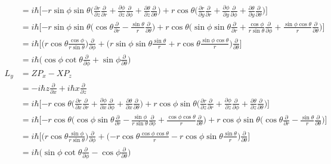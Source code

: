 \documentclass[../principles-of-quantum-mechanics.tex]{subfiles}
\begin{document}
\begin{questions}
\begin{solution}
\begin{align*}
			&= i\hbar\Big[{-r\sin\phi}\sin\theta\Big(\frac{\partial r}{\partial z}\frac{\partial}{\partial r} + \frac{\partial \phi}{\partial z}\frac{\partial}{\partial \phi} + \frac{\partial \theta}{\partial z}\frac{\partial}{\partial\theta}\Big) + r\cos\theta\Big(\frac{\partial r}{\partial y}\frac{\partial}{\partial r} + \frac{\partial \phi}{\partial y}\frac{\partial}{\partial \phi} + \frac{\partial \theta}{\partial y}\frac{\partial}{\partial\theta}\Big)\Big] \\
			&= i\hbar\Big[{-r\sin\phi}\sin\theta\Big(\cos\theta\frac{\partial}{\partial r} - \frac{\sin\theta}{r}\frac{\partial}{\partial\theta}\Big) + r\cos\theta\Big(\sin\phi\sin\theta\frac{\partial}{\partial r} + \frac{\cos\phi}{r\sin\theta}\frac{\partial}{\partial \phi} + \frac{\sin\phi\cos\theta}{r}\frac{\partial}{\partial\theta}\Big)\Big] \\
			&= i\hbar\Big[\Big(r\cos\theta\frac{\cos\phi}{r\sin\theta}\Big)\frac{\partial}{\partial \phi} + \Big(r\sin\phi\sin\theta\frac{\sin\theta}{r} + r\cos\theta\frac{\sin\phi\cos\theta}{r}\Big)\frac{\partial}{\partial\theta}\Big] \\
			&= i\hbar\Big(\cos\phi\cot\theta\frac{\partial}{\partial\phi} + \sin\phi\frac{\partial}{\partial\theta}\Big) \\
			L_y &= ZP_x - XP_z \\
			&= -i\hbar z\frac{\partial}{\partial x} + i\hbar x\frac{\partial}{\partial z} \\
			&= i\hbar\Big[{-r\cos\theta}\Big(\frac{\partial r}{\partial x}\frac{\partial}{\partial r} + \frac{\partial \phi}{\partial x}\frac{\partial}{\partial \phi} + \frac{\partial \theta}{\partial x}\frac{\partial}{\partial\theta}\Big) + r\cos\phi\sin\theta\Big(\frac{\partial r}{\partial z}\frac{\partial}{\partial r} + \frac{\partial \phi}{\partial z}\frac{\partial}{\partial \phi} + \frac{\partial \theta}{\partial z}\frac{\partial}{\partial\theta}\Big)\Big] \\
			&= i\hbar\Big[{-r\cos\theta}\Big(\cos\phi\sin\theta\frac{\partial}{\partial r} - \frac{\sin\phi}{r\sin\theta}\frac{\partial}{\partial \phi} + \frac{\cos\phi\cos\theta}{r}\frac{\partial}{\partial \theta}\Big) + r\cos\phi\sin\theta\Big(\cos\theta\frac{\partial}{\partial r} - \frac{\sin\theta}{r}\frac{\partial}{\partial \theta}\Big)\Big] \\
			&= i\hbar\Big[\Big(r\cos\theta\frac{\sin\phi}{r\sin\theta}\Big)\frac{\partial}{\partial \phi} + \Big({-r\cos\theta}\frac{\cos\phi\cos\theta}{r} - r\cos\phi\sin\theta\frac{\sin\theta}{r}\Big)\frac{\partial}{\partial\theta}\Big] \\
			&= i\hbar\Big(\sin\phi\cot\theta\frac{\partial}{\partial\phi} - \cos\phi\frac{\partial}{\partial\theta}\Big)
			\end{align*}
		\end{solution}
	

\end{questions}
\end{document}
